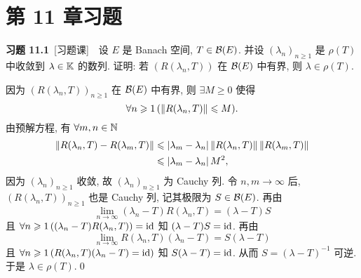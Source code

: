 \section{第 11 章习题}
	\textbf{习题 11.1}\ [习题课]\ \ 设 $ E $ 是 Banach 空间, $ T\in\mathcal{B}(E) $. 并设 $ (\lambda_{n})_{n\geqslant1} $ 是 $ \rho(T) $ 中收敛到 $ \lambda\in\mathbb{K} $ 的数列. 证明: 若 $ (R(\lambda_{n}, T)) $ 在 $ \mathcal{B}(E) $ 中有界, 则 $ \lambda\in\rho(T) $.
	\begin{Proof}
		因为 $ (R(\lambda_{n}, T))_{n\geqslant1} $ 在 $ \mathcal{B}(E) $ 中有界, 则 $ \exists M\geqslant0 $ 使得
		\[
			\forall n\geqslant1\,(\left\| R(\lambda_{n}, T) \right\|\leqslant M).
		\]
		由预解方程, 有 $ \forall m, n\in\mathbb{N} $
		\[
			\begin{aligned}
				\left\| R(\lambda_{n}, T)-R(\lambda_{m}, T) \right\| & \leqslant \left| \lambda_{m}-\lambda_{n} \right| \left\| R(\lambda_{n}, T) \right\|\left\| R(\lambda_{m}, T) \right\|\\
				& \leqslant\left| \lambda_{m}-\lambda_{n} \right| M^{2},
			\end{aligned}
		\]
		因为 $ (\lambda_{n})_{n\geqslant1} $ 收敛, 故 $ (\lambda_{n})_{n\geqslant1} $ 为 Cauchy 列. 令 $ n, m\to\infty $ 后, $ (R(\lambda_{n}, T))_{n\geqslant1} $ 也是 Cauchy 列, 记其极限为 $ S\in\mathcal{B}(E) $. 再由
		\[
			\lim_{n\to\infty}(\lambda_{n}-T)R(\lambda_{n}, T)=(\lambda-T)S
		\]
		且 $ \forall n\geqslant1\,((\lambda_{n}-T)R(\lambda_{n}, T))=\mathrm{id} $ 知 $ (\lambda-T)S=\mathrm{id} $. 再由
		\[
			\lim_{n\to\infty} R(\lambda_{n}, T)(\lambda_{n}-T)=S(\lambda-T)
		\]
		且 $ \forall n\geqslant1\,(R(\lambda_{n}, T)(\lambda_{n}-T)=\mathrm{id}) $ 知 $ S(\lambda-T)=\mathrm{id} $. 从而 $ S=(\lambda-T)^{-1} $ 可逆. 于是 $ \lambda\in\rho(T) $.\qed
	\end{Proof}

